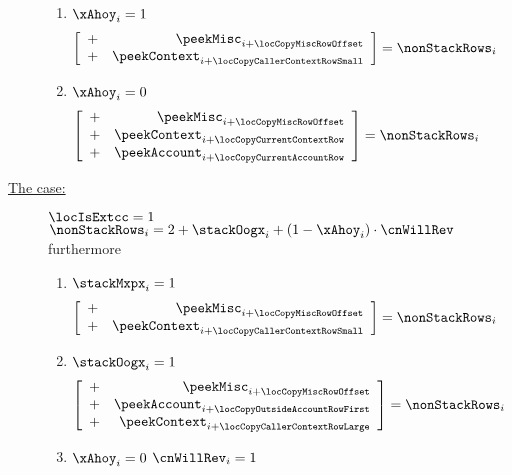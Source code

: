 \begin{description}
\begin{description}
				\begin{enumerate}
					\item \If $\xAhoy_{i} = 1$ \Then
						\[
							\left[ \begin{array}{cr}
								+ & \peekMisc      _{i + \locCopyMiscRowOffset         } \\
								+ & \peekContext   _{i + \locCopyCallerContextRowSmall } \\
							\end{array} \right]
							= \nonStackRows_{i}
						\]
					\item \If $\xAhoy_{i} = 0$ \Then
						\[
							\left[ \begin{array}{cr}
								+ & \peekMisc      _{i + \locCopyMiscRowOffset     } \\
								+ & \peekContext   _{i + \locCopyCurrentContextRow } \\
								+ & \peekAccount   _{i + \locCopyCurrentAccountRow } \\
							\end{array} \right]
							= \nonStackRows_{i}
						\]
				\end{enumerate}
			\item[\underline{The \inst{EXTCODECOPY} case:}]
				\If $\locIsExtcc = 1$ \Then $\nonStackRows_{i} = 2 + \stackOogx_{i} + (1 - \xAhoy_{i}) \cdot \cnWillRev$ furthermore
				\begin{enumerate}
					\item \If $\stackMxpx_{i} = 1$ \Then
						\[
							\left[ \begin{array}{cr}
								+ & \peekMisc      _{i + \locCopyMiscRowOffset         } \\
								+ & \peekContext   _{i + \locCopyCallerContextRowSmall } \\
							\end{array} \right]
							= \nonStackRows_{i}
						\]
					\item \If $\stackOogx_{i} = 1$ \Then
						\[
							\left[ \begin{array}{cr}
								+ & \peekMisc      _{i + \locCopyMiscRowOffset          } \\
								+ & \peekAccount   _{i + \locCopyOutsideAccountRowFirst } \\
								+ & \peekContext   _{i + \locCopyCallerContextRowLarge  } \\
							\end{array} \right]
							= \nonStackRows_{i}
						\]
					\item \If $\xAhoy_{i} = 0$ \et $\cnWillRev_{i} = 1$ \Then

\end{enumerate}
\end{description}
\end{description}
